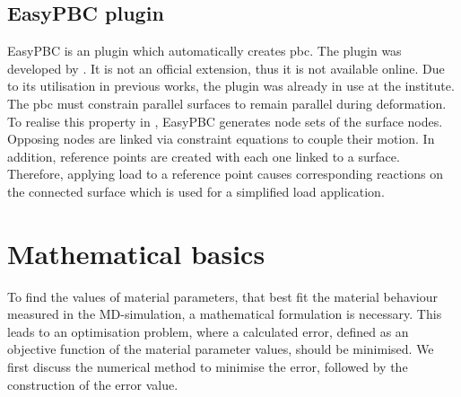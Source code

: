 \subsection{EasyPBC plugin} \label{subsec: EasPBC}

EasyPBC is an  plugin which automatically creates \acrshort{pbc}. The plugin was developed by \citet{omairey_development_2019}. It is not an official  extension, thus it is not available online. Due to its utilisation in previous works, the plugin was already in use at the institute. The \acrshort{pbc} must constrain parallel surfaces to remain parallel during deformation. To realise this property in , EasyPBC generates node sets of the surface nodes. Opposing nodes are linked via constraint equations to couple their motion. In addition, reference points are created with each one linked to a surface. Therefore, applying load to a reference point causes corresponding reactions on the connected surface which is used for a simplified load application. 








\section{Mathematical basics} \label{sec: mathematics}

To find the values of material parameters, that best fit the material behaviour measured in the MD-simulation, a mathematical formulation is necessary. This leads to an optimisation problem, where a calculated error, defined as an objective function of the material parameter values, should be minimised. We first discuss the numerical method to minimise the error, followed by the construction of the error value.

